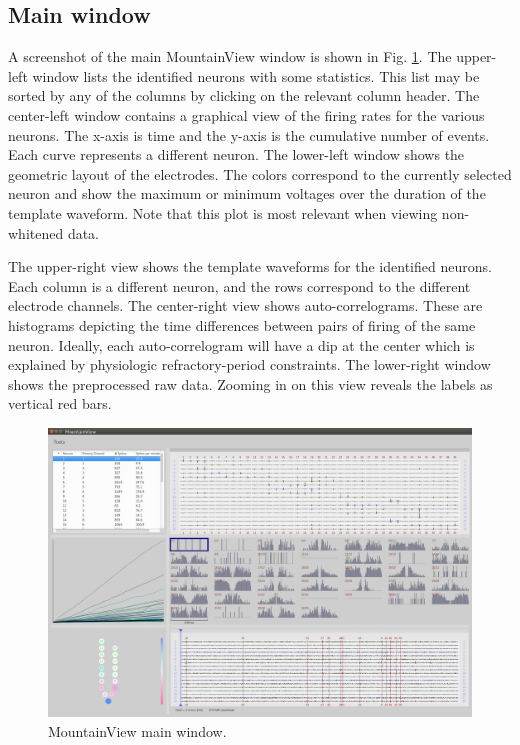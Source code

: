 \documentclass[hidelinks,10pt]{article}
\begin{document}
\subsection {Main window}

A screenshot of the main MountainView window is shown in Fig. \ref{fig:mountainview_main_window}.
The upper-left window lists the identified neurons with some statistics. This list may be sorted by any of the columns by clicking on the relevant column header. The center-left window contains a graphical view of the firing rates for the various neurons. The x-axis is time and the y-axis is the cumulative number of events. Each curve represents a different neuron. The lower-left window shows the geometric layout of the electrodes. The colors correspond to the currently selected neuron and show the maximum or minimum voltages over the duration of the template waveform. Note that this plot is most relevant when viewing non-whitened data.

The upper-right view shows the template waveforms for the identified neurons. Each column is a different neuron, and the rows correspond to the different electrode channels. The center-right view shows auto-correlograms. These are histograms depicting the time differences between pairs of firing of the same neuron. Ideally, each auto-correlogram will have a dip at the center which is explained by physiologic refractory-period constraints. The lower-right window shows the preprocessed raw data. Zooming in on this view reveals the labels as vertical red bars.

\begin{figure}[!h]
\centering
\includegraphics[width=6in]{images/mountainview_main_window.png}
\caption{
MountainView main window.
}
\label{fig:mountainview_main_window}
\end{figure}
\end{document}
